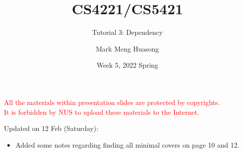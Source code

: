 \title{CS4221/CS5421}

\subtitle{Tutorial 3: Dependency}

\author{Mark Meng Huasong}



\date{Week 5, 2022 Spring}

\begin{frame}
	\titlepage
	\begin{tcolorbox}
		\begin{center}
			{\scriptsize \textcolor{red}{All the materials within presentation slides are protected by copyrights.\\
					It is forbidden by NUS to upload these materials to the Internet.}}
		\end{center}
	\end{tcolorbox}
\end{frame}

\begin{frame}
	Updated on 12 Feb (Saturday):
	\begin{itemize}
		\item Added some notes regarding finding all minimal covers on page 10 and 12.
	\end{itemize}
\end{frame}


